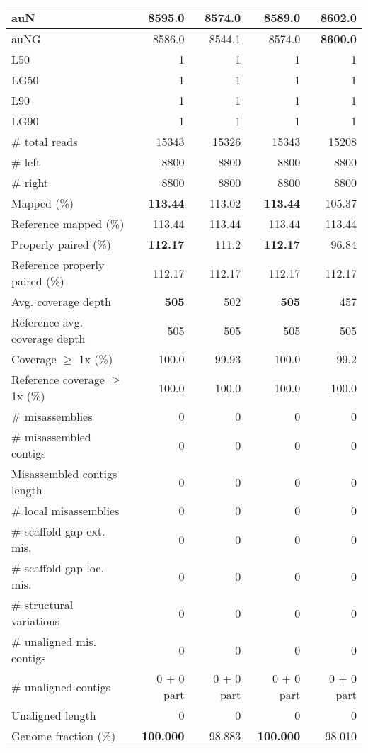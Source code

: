 \documentclass[12pt,a4paper]{article}
\begin{document}
\begin{table}[ht]
\begin{center}
\begin{tabular}{|l*{4}{|r}|}
auN & 8595.0 & 8574.0 & 8589.0 & {\bf 8602.0} \\ \hline
auNG & 8586.0 & 8544.1 & 8574.0 & {\bf 8600.0} \\ \hline
L50 & 1 & 1 & 1 & 1 \\ \hline
LG50 & 1 & 1 & 1 & 1 \\ \hline
L90 & 1 & 1 & 1 & 1 \\ \hline
LG90 & 1 & 1 & 1 & 1 \\ \hline
\# total reads & 15343 & 15326 & 15343 & 15208 \\ \hline
\# left & 8800 & 8800 & 8800 & 8800 \\ \hline
\# right & 8800 & 8800 & 8800 & 8800 \\ \hline
Mapped (\%) & {\bf 113.44} & 113.02 & {\bf 113.44} & 105.37 \\ \hline
Reference mapped (\%) & 113.44 & 113.44 & 113.44 & 113.44 \\ \hline
Properly paired (\%) & {\bf 112.17} & 111.2 & {\bf 112.17} & 96.84 \\ \hline
Reference properly paired (\%) & 112.17 & 112.17 & 112.17 & 112.17 \\ \hline
Avg. coverage depth & {\bf 505} & 502 & {\bf 505} & 457 \\ \hline
Reference avg. coverage depth & 505 & 505 & 505 & 505 \\ \hline
Coverage $\geq$ 1x (\%) & 100.0 & 99.93 & 100.0 & 99.2 \\ \hline
Reference coverage $\geq$ 1x (\%) & 100.0 & 100.0 & 100.0 & 100.0 \\ \hline
\# misassemblies & 0 & 0 & 0 & 0 \\ \hline
\# misassembled contigs & 0 & 0 & 0 & 0 \\ \hline
Misassembled contigs length & 0 & 0 & 0 & 0 \\ \hline
\# local misassemblies & 0 & 0 & 0 & 0 \\ \hline
\# scaffold gap ext. mis. & 0 & 0 & 0 & 0 \\ \hline
\# scaffold gap loc. mis. & 0 & 0 & 0 & 0 \\ \hline
\# structural variations & 0 & 0 & 0 & 0 \\ \hline
\# unaligned mis. contigs & 0 & 0 & 0 & 0 \\ \hline
\# unaligned contigs & 0 + 0 part & 0 + 0 part & 0 + 0 part & 0 + 0 part \\ \hline
Unaligned length & 0 & 0 & 0 & 0 \\ \hline
Genome fraction (\%) & {\bf 100.000} & 98.883 & {\bf 100.000} & 98.010 \\ \hline

\end{tabular}
\end{center}
\end{table}
\end{document}
